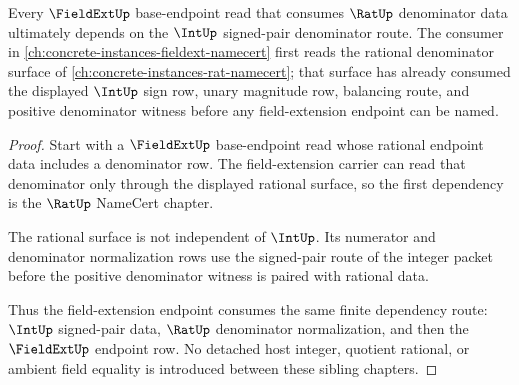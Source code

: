 \begin{theorem}
\label{thm:int-fieldext-rat-denominator-sibling-route}
Every $\FieldExtUp$ base-endpoint read that consumes $\RatUp$ denominator data ultimately depends on the $\IntUp$ signed-pair denominator route. The consumer in \autoref{ch:concrete-instances-fieldext-namecert} first reads the rational denominator surface of \autoref{ch:concrete-instances-rat-namecert}; that surface has already consumed the displayed $\IntUp$ sign row, unary magnitude row, balancing route, and positive denominator witness before any field-extension endpoint can be named.
\end{theorem}
\begin{proof}
Start with a $\FieldExtUp$ base-endpoint read whose rational endpoint data includes a denominator row. The field-extension carrier can read that denominator only through the displayed rational surface, so the first dependency is the $\RatUp$ NameCert chapter.

The rational surface is not independent of $\IntUp$. Its numerator and denominator normalization rows use the signed-pair route of the integer packet before the positive denominator witness is paired with rational data.

Thus the field-extension endpoint consumes the same finite dependency route: $\IntUp$ signed-pair data, $\RatUp$ denominator normalization, and then the $\FieldExtUp$ endpoint row. No detached host integer, quotient rational, or ambient field equality is introduced between these sibling chapters.
\end{proof}
